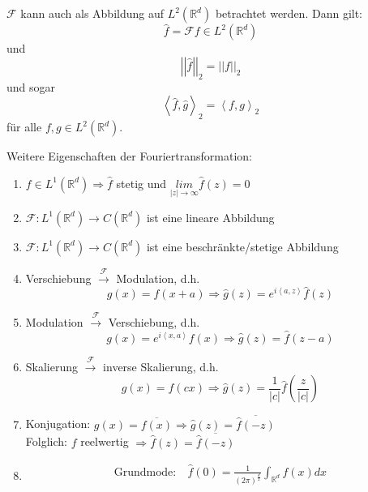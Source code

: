 \documentclass{article}
\theoremstyle{plain}
\theoremstyle{definition}
\numberwithin{equation}{section}
\newcommand{\norm}[1] {
\left|\left| #1 \right|\right|
}
\newcommand{\skprod}[2]{
\left \langle #1,#2 \right \rangle
}
\newcommand{\abs}[1] {
\left| #1 \right|
}
\newcommand{\R}[0] {
\mathbb R
}
\begin{document}
    $\mathcal F$ kann auch als Abbildung auf $L^2(\R^d)$ betrachtet werden. Dann gilt:\\
    \[\hat f = \mathcal F f \in L^2(\R^d)\]
    und
    \begin{equation}
        \norm{\hat f}_2 = \norm{f}_2
    \end{equation}
    und sogar
    \begin{equation}
        \skprod{\hat f}{\hat g}_2 = \skprod{f}{g}_2
    \end{equation}
    für alle $f,g \in L^2(\R^d)$.

    Weitere Eigenschaften der Fouriertransformation:

    \begin{enumerate}[label = \roman *)]
        \item $f \in L^1(\R^d) \Rightarrow \hat f$ stetig und $\underset{\abs{z} \to \infty}{lim} \hat f(z) = 0$
        \item $\mathcal F: L^1(\R^d) \to C(\R^d)$ ist eine lineare Abbildung
        \item $\mathcal F: L^1(\R^d) \to C(\R^d)$ ist eine beschränkte/stetige Abbildung
        \item Verschiebung $\overset{\mathcal F}{\to}$ Modulation, d.h.
        \begin{equation*}
            g(x) = f(x+a) \Rightarrow \hat g(z) = e^{i \skprod{a}{z}} \hat f(z)
        \end{equation*}
        \item Modulation $\overset{\mathcal F}{\to}$ Verschiebung, d.h.
        \begin{equation*}
            g(x) = e^{i \skprod{x}{a}} f(x) \Rightarrow \hat g(z)= \hat f(z-a)
        \end{equation*}
        \item Skalierung $\overset{\mathcal F}{\to}$ inverse Skalierung, d.h.
        \begin{equation*}
            g(x)=f(cx) \Rightarrow \hat g(z) = \frac{1}{\abs c} \hat f(\frac{z}{\abs c})
        \end{equation*}
        \item Konjugation: $g(x) = \overline{f(x)} \Rightarrow \hat g(z) = \overline{\hat f (-z)}$\\
        Folglich: $f$ reelwertig $\Rightarrow \hat f(z) = \overline{\hat f(-z)}$
        \item
        \begin{align*}
            \text{Grundmode:} \ & \displaystyle \hat f(0) = \frac{1}{(2 \pi )^\frac{d}{2}} \int_{\R^d} f(x) dx\\

\end{align*}
\end{enumerate}
\end{document}
